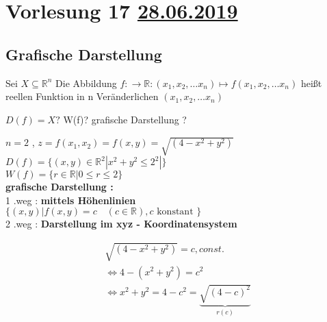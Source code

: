 \section{Vorlesung 17 \href{https://tu-dresden.de/mn/math/algebra/das-institut/beschaeftigte/antje-noack/ressourcen/dateien/v120-1/MathMethInf17.pdf?lang=en}{28.06.2019} }
\subsection{Grafische Darstellung}
\begin{definition}
Sei $ X \subseteq \mathbb{R}^n $ Die Abbildung $f : \rightarrow \mathbb{R} : (x_1 , x_2, \dots x_n ) \mapsto f(x_1 , x_2, \dots x_n )$ heißt reellen Funktion in n Veränderlichen $(x_1 , x_2, \dots x_n )$
\end{definition}
\begin{remark}
$D(f)= X ? $ W(f)? grafische Darstellung ?
\end{remark} 
\begin{example}
$n= 2$ , $ z = f(x_1 , x_2)= f(x,y)= \sqrt{(4-x^2+y^2)}$\\
$D(f) = \{ (x,y) \in \mathbb{R}^2  |x^2 + y^2 \leq 2^2 | \}$\\
$W(f)= \{ r \in \mathbb{R} | 0 \leq r \leq 2 \}$\\
\textbf{grafische Darstellung :}\\
1 .weg : \textbf{mittels Höhenlinien }\\
$ \{ (x,y) | f(x,y) = c \quad (c \in \mathbb{R}) , c \text{ konstant }  \}$\\
2 .weg : \textbf{Darstellung im xyz - Koordinatensystem }\\
\begin{example}
\begin{gather*}
\sqrt{(4-x^2+y^2)}= c , const.\\
\Leftrightarrow 4-(x^2+y^2) = c^2\\
\Leftrightarrow x^2+y^2 = 4 - c^2 = \underbrace{\sqrt{(4-c)^2}}_{r(c)}
\end{gather*}
\end{example}
\end{example}

